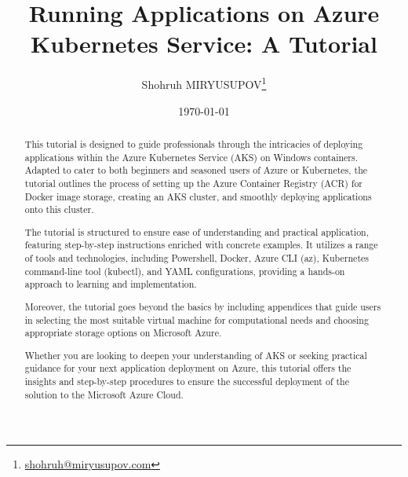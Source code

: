 \documentclass{article}
\title{Running Applications on Azure Kubernetes Service: A Tutorial}
\author{Shohruh MIRYUSUPOV\thanks{ \href{mailto:shohruh@miryusupov.com}{shohruh@miryusupov.com} }}
\date{\today}
\begin{document}
\maketitle

\begin{abstract}
This tutorial is designed to guide professionals through the intricacies of deploying applications within the Azure Kubernetes Service (AKS) on Windows containers. Adapted to cater to both beginners and seasoned users of Azure or Kubernetes, the tutorial outlines the process of setting up the Azure Container Registry (ACR) for Docker image storage, creating an AKS cluster, and smoothly deploying applications onto this cluster.

The tutorial is structured to ensure ease of understanding and practical application, featuring step-by-step instructions enriched with concrete examples. It utilizes a range of tools and technologies, including Powershell, Docker, Azure CLI (az), Kubernetes command-line tool (kubectl), and YAML configurations, providing a hands-on approach to learning and implementation.

Moreover, the tutorial goes beyond the basics by including appendices that guide users in selecting the most suitable virtual machine for computational needs and choosing appropriate storage options on Microsoft Azure. 

Whether you are looking to deepen your understanding of AKS or seeking practical guidance for your next application deployment on Azure, this tutorial offers the insights and step-by-step procedures to ensure the successful deployment of the solution to the Microsoft Azure Cloud.
\end{abstract}
\end{document}
